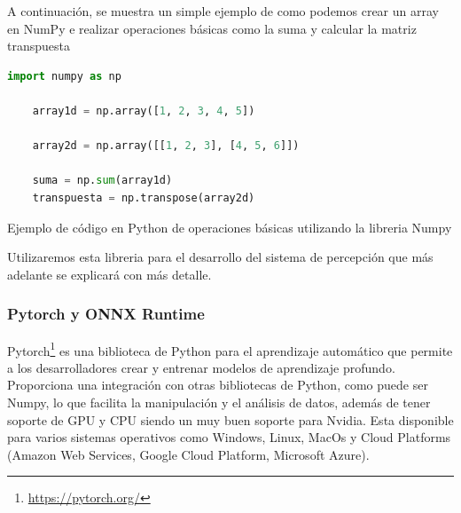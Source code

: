 A continuación, se muestra un simple ejemplo de como podemos crear un array en NumPy e realizar operaciones básicas como la suma y calcular la matriz transpuesta

\begin{code}[h]
  \begin{lstlisting}[language=Python]
    import numpy as np

    array1d = np.array([1, 2, 3, 4, 5])

    array2d = np.array([[1, 2, 3], [4, 5, 6]])

    suma = np.sum(array1d)  
    transpuesta = np.transpose(array2d)  
  \end{lstlisting}
  \caption[Ejemplo de código en Python de operaciones básicas utilizando la libreria Numpy]{Ejemplo de código en Python de operaciones básicas utilizando la libreria Numpy}
  \label{cod:Numpy}
  \end{code}  

Utilizaremos esta libreria para el desarrollo del sistema de percepción que más adelante se explicará con más detalle. 

\subsubsection{Pytorch y ONNX Runtime}
\label{sec:pytorchandonnx}
Pytorch\footnote{\url{https://pytorch.org/}} es una biblioteca de Python para el aprendizaje automático que permite a 
los desarrolladores crear y entrenar modelos de aprendizaje profundo. Proporciona una integración con otras bibliotecas de Python, como puede ser
Numpy, lo que facilita la manipulación y el análisis de datos, además de tener soporte de GPU y CPU siendo un muy buen soporte para Nvidia. Esta disponible para varios sistemas operativos 
como Windows, Linux, MacOs y Cloud Platforms (Amazon Web Services, Google Cloud Platform, Microsoft Azure).\newline

